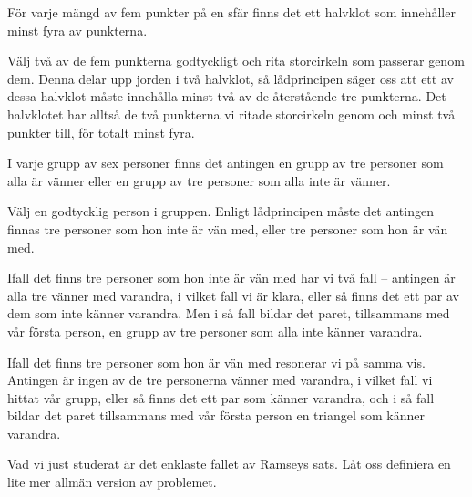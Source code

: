 \documentclass[nobib]{tufte-handout}
\begin{document}
\begin{example}
  För varje mängd av fem punkter på en sfär finns det ett halvklot som innehåller minst fyra av punkterna.

  Välj två av de fem punkterna godtyckligt och rita storcirkeln som passerar genom dem. Denna delar upp jorden i två halvklot, så lådprincipen säger oss att ett av dessa halvklot måste innehålla minst två av de återstående tre punkterna. Det halvklotet har alltså de två punkterna vi ritade storcirkeln genom och minst två punkter till, för totalt minst fyra.
\end{example}

\begin{example}\label{example_R33_is_6}
  I varje grupp av sex personer finns det antingen en grupp av tre personer som alla är vänner eller en grupp av tre personer som alla inte är vänner.

  Välj en godtycklig person i gruppen. Enligt lådprincipen måste det antingen finnas tre personer som hon inte är vän med, eller tre personer som hon är vän med.

  Ifall det finns tre personer som hon inte är vän med har vi två fall -- antingen är alla tre vänner med varandra, i vilket fall vi är klara, eller så finns det ett par av dem som inte känner varandra. Men i så fall bildar det paret, tillsammans med vår första person, en grupp av tre personer som alla inte känner varandra.

  Ifall det finns tre personer som hon är vän med resonerar vi på samma vis. Antingen är ingen av de tre personerna vänner med varandra, i vilket fall vi hittat vår grupp, eller så finns det ett par som känner varandra, och i så fall bildar det paret tillsammans med vår första person en triangel som känner varandra.
\end{example}

Vad vi just studerat är det enklaste fallet av Ramseys sats. Låt oss definiera en lite mer allmän version av problemet.
\end{document}

